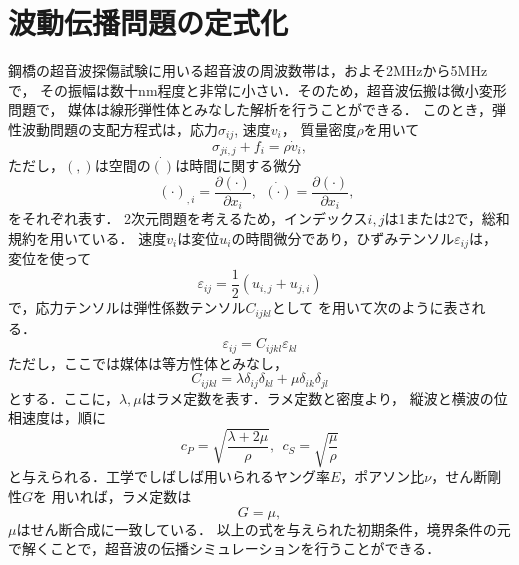 \section{波動伝播問題の定式化}
鋼橋の超音波探傷試験に用いる超音波の周波数帯は，およそ2MHzから5MHzで，
その振幅は数十nm程度と非常に小さい．そのため，超音波伝搬は微小変形問題で，
媒体は線形弾性体とみなした解析を行うことができる．
このとき，弾性波動問題の支配方程式は，応力$\sigma_{ij}$, 速度$v_i$，
質量密度$\rho$を用いて
\begin{equation}
	\sigma_{ji,j}+f_i=\rho \dot{v}_i,
	\label{eqn:}
\end{equation}
ただし，$(,)$は空間の$\dot{()}$は時間に関する微分
\begin{equation}
	(\cdot)_{,i}=\frac{\partial (\cdot)}{\partial x_i}, \ \ 
	\dot{(\cdot)}=\frac{\partial (\cdot)}{\partial x_i}, \ \ 
	\label{eqn:}
\end{equation}
をそれぞれ表す．
2次元問題を考えるため，インデックス$i,j$は1または2で，総和規約を用いている．
速度$v_i$は変位$u_i$の時間微分であり，ひずみテンソル$\varepsilon_{ij}$は，
変位を使って
\begin{equation}
	\varepsilon_{ij}=\frac{1}{2}(u_{i,j}+u_{j,i})
	\label{eqn:}
\end{equation}
で，応力テンソルは弾性係数テンソル$C_{ijkl}$として
を用いて次のように表される．
\begin{equation}
	\varepsilon_{ij}=C_{ijkl}\varepsilon_{kl}
	\label{eqn:}
\end{equation}
ただし，ここでは媒体は等方性体とみなし，
\begin{equation}
	C_{ijkl}=\lambda \delta_{ij}\delta_{kl} +\mu \delta_{ik}\delta_{jl}
	\label{eqn:}
\end{equation}
とする．ここに，$\lambda, \mu$はラメ定数を表す．ラメ定数と密度より，
縦波と横波の位相速度は，順に
\begin{equation}
	c_{P}=\sqrt{\frac{\lambda + 2\mu}{\rho}}
	, \ \ 
	c_{S}=\sqrt{\frac{\mu}{\rho}}
	\label{eqn:}
\end{equation}
と与えられる．工学でしばしば用いられるヤング率$E$，ポアソン比$\nu$，せん断剛性$G$を
用いれば，ラメ定数は
\begin{equation}
	G=\mu, 
	\label{eqn:}
\end{equation}
$\mu$はせん断合成に一致している．
以上の式を与えられた初期条件，境界条件の元で解くことで，超音波の伝播シミュレーションを行うことができる．
